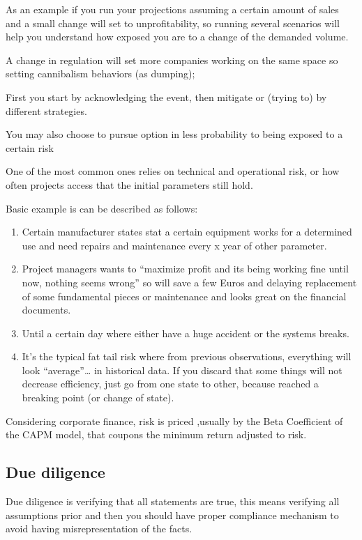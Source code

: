 \documentclass[]{book}
\theoremstyle{definition}
\theoremstyle{definition}
\theoremstyle{definition}
\theoremstyle{remark}
\begin{document}
As an example if you run your projections assuming a certain amount of
sales and a small change will set to unprofitability, so running several
scenarios will help you understand how exposed you are to a change of
the demanded volume.

A change in regulation will set more companies working on the same space
so setting cannibalism behaviors (as dumping);

First you start by acknowledging the event, then mitigate or (trying to)
by different strategies.

You may also choose to pursue option in less probability to being
exposed to a certain risk

One of the most common ones relies on technical and operational risk, or
how often projects access that the initial parameters still hold.

Basic example is can be described as follows:

\begin{enumerate}
\def\labelenumi{\arabic{enumi}.}
\item
  Certain manufacturer states stat a certain equipment works for a
  determined use and need repairs and maintenance every x year of other
  parameter.
\item
  Project managers wants to ``maximize profit and its being working fine
  until now, nothing seems wrong'' so will save a few Euros and delaying
  replacement of some fundamental pieces or maintenance and looks great
  on the financial documents.
\item
  Until a certain day where either have a huge accident or the systems
  breaks.
\item
  It's the typical fat tail risk where from previous observations,
  everything will look ``average''\ldots{} in historical data. If you
  discard that some things will not decrease efficiency, just go from
  one state to other, because reached a breaking point (or change of
  state).
\end{enumerate}

Considering corporate finance, risk is priced ,usually by the Beta
Coefficient of the CAPM model, that coupons the minimum return adjusted
to risk.

\subsection{Due diligence}\label{due-diligence}

Due diligence is verifying that all statements are true, this means
verifying all assumptions prior and then you should have proper
compliance mechanism to avoid having misrepresentation of the facts.
\end{document}
